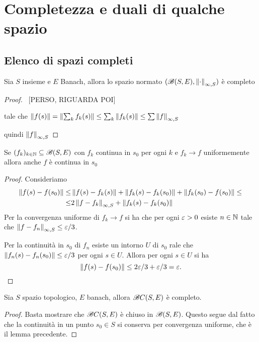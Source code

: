 \chapter{Completezza e duali di qualche spazio}

\section{Elenco di spazi completi}

\begin{proposition}
Sia $S$ insieme e $E$ Banach, allora lo spazio normato $(\mathscr{B}(S,E),\left\Vert{\cdot}\right\Vert_{\infty,S})$ \`e completo
\end{proposition}
\begin{proof}
~[PERSO, RIGUARDA POI]

tale che $\left\Vert{f(s)}\right\Vert=\left\Vert{\sum_kf_k(s)}\right\Vert\leq \sum_k\left\Vert{f_k(s)}\right\Vert\leq \sum \left\Vert{f}\right\Vert_{\infty,S}$

quindi $\left\Vert{f}\right\Vert_{\infty,S}$
\end{proof}


\begin{lemma}
Se $(f_k)_{k\in\mathbb{N}}\subseteq \mathscr{B}(S,E)$ con $f_k$ continua in $s_0$ per ogni $k$ e $f_k\to f$ uniformemente allora anche $f$ \`e continua in $s_0$
\end{lemma}
\begin{proof}
Consideriamo
\begin{align*}
\left\Vert{f(s)-f(s_0)}\right\Vert\leq&\left\Vert{f(s)-f_k(s)}\right\Vert+\left\Vert{f_k(s)-f_k(s_0)}\right\Vert+\left\Vert{f_k(s_0)-f(s_0)}\right\Vert\leq\\
\leq&2\left\Vert{f-f_k}\right\Vert_{\infty,S}+\left\Vert{f_k(s)-f_k(s_0)}\right\Vert
\end{align*}
Per la convergenza uniforme di $f_k\to f$ si ha che per ogni $\varepsilon>0$ esiste $n\in\mathbb{N}$ tale che $\left\Vert{f-f_n}\right\Vert_{\infty,S}\leq \varepsilon/3$.

Per la continuit\`a in $s_0$ di $f_n$ esiste un intorno $U$ di $s_0$ rale che $\left\Vert{f_n(s)-f_n(s_0)}\right\Vert\leq \varepsilon/3$ per ogni $s\in U$. Allora per ogni $s\in U$ si ha
\[\left\Vert{f(s)-f(s_0)}\right\Vert\leq2\varepsilon/3+\varepsilon/3=\varepsilon.\]
\end{proof}

\begin{proposition}
Sia $S$ spazio topologico, $E$ banach, allora $\mathscr{B} C(S,E)$ \`e completo.
\end{proposition}
\begin{proof}
Basta mostrare che $\mathscr{B} C(S,E)$ \`e chiuso in $\mathscr{B}(S,E)$. Questo segue dal fatto che la continuit\`a in un punto $s_0\in S$ si conserva per convergenza uniforme, che \`e il lemma precedente.
\end{proof}

